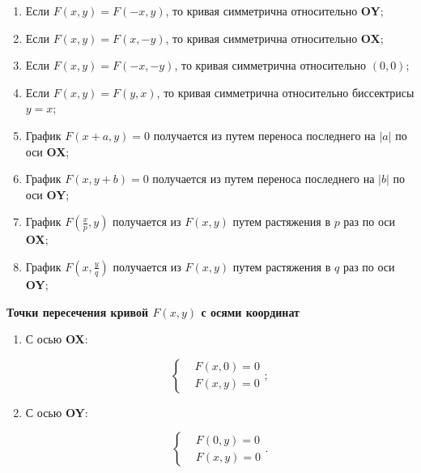 \begin{enumerate}
	\item Если $F \left( x, y \right) = F \left( - x, y \right)$, то кривая симметрична относительно \textbf{OY};
	
	\item Если $F \left( x, y \right) = F \left( x, - y \right)$, то кривая симметрична относительно \textbf{OX};
	
	\item Если $F \left( x, y \right) = F \left( - x, - y \right)$, то кривая симметрична относительно $\left( 0, 0 \right)$;
	
	\item Если $F \left( x, y \right) = F \left( y, x \right)$, то кривая симметрична относительно биссектрисы $y = x$;
	
	\item График $F \left( x + a, y \right) = 0$ получается из  путем переноса последнего на $\left| a \right|$ по оси \textbf{OX};
	
	\item График $F \left( x, y  + b \right) = 0$ получается из  путем переноса последнего на $\left| b \right|$ по оси \textbf{OY};
	
	\item График $F \left( \frac{x}{p}, y \right)$ получается из $F \left( x, y \right)$  путем растяжения в $p$ раз по оси \textbf{OX};
	
	\item График $F \left( x, \frac{y}{q} \right)$ получается из $F \left( x, y \right)$  путем растяжения в $q$ раз по оси \textbf{OY};
\end{enumerate}

\textbf{Точки пересечения кривой $F \left( x, y \right)$ с осями координат}

\begin{enumerate}
	\item С осью \textbf{OX}:
	
	\[
	\begin{cases}
	& F \left( x, 0 \right) = 0\\
	& F \left( x, y \right) = 0
	\end{cases};
	\]
	
	\item С осью \textbf{OY}:
	
	\[
	\begin{cases}
	& F \left( 0, y \right) = 0\\
	& F \left( x, y \right) = 0
	\end{cases}.
	\]
	
\end{enumerate}

